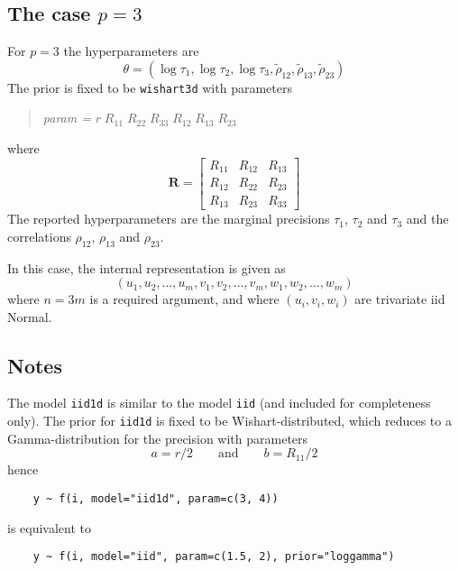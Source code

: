 \documentclass[a4paper,11pt]{article}
\begin{document}
\subsection*{The case $p=3$}

For $p=3$ the
hyperparameters are
\begin{displaymath}
    \theta = (\log \tau_{1}, \log \tau_{2}, \log \tau_{3},
    \tilde\rho_{12},
    \tilde\rho_{13},
    \tilde\rho_{23})
\end{displaymath}
The prior is fixed to be \texttt{wishart3d} with parameters
\begin{quote}
    \emph{param = } $r\;R_{11}\;R_{22}\;R_{33}\; R_{12}\;
    R_{13}\; R_{23}$
\end{quote}
where
\begin{displaymath}
    \mathbf{R} =
    \left[\begin{array}{ccc}
        R_{11} &R_{12} & R_{13}\\
        R_{12} & R_{22} & R_{23}\\
        R_{13} & R_{23} & R_{33}
    \end{array}\right]
\end{displaymath}
The reported hyperparameters are the marginal precisions $\tau_{1}$,
$\tau_{2}$ and $\tau_{3}$ and the correlations $\rho_{12}$,
$\rho_{13}$ and $\rho_{23}$.

In this case, the internal representation is given as
\begin{displaymath}
    (u_{1}, u_{2}, \ldots, u_{m}, v_{1}, v_{2}, \ldots, v_{m},
    w_{1}, w_{2}, \ldots, w_{m})
\end{displaymath}
where $n=3m$ is a required argument, and where $(u_{i}, v_{i}, w_{i})$
are trivariate iid Normal.


\subsection*{Notes}

The model \texttt{iid1d} is similar to the model \texttt{iid} (and
included for completeness only). The prior for \texttt{iid1d} is fixed
to be Wishart-distributed, which reduces to a Gamma-distribution for
the precision with parameters
\begin{displaymath}
    a = r/2 \qquad\text{and}\qquad b = R_{11}/2
\end{displaymath}
hence
\begin{verbatim}
    y ~ f(i, model="iid1d", param=c(3, 4))
\end{verbatim}
is equivalent to
\begin{verbatim}
    y ~ f(i, model="iid", param=c(1.5, 2), prior="loggamma")
\end{verbatim}
\end{document}
